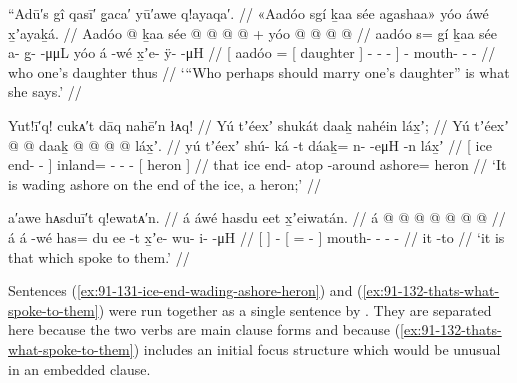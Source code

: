 \ex\label{ex:91-130-who-should-marry-she-says}%
%
\begingl
	\glpreamble	“Adū′s gî qasī′ g̣aca′ yū′awe q!ayaqa′. //
	\glpreamble	«\!Aadóo sgí ḵaa sée ag̱ashaa\!» yóo áwé x̱ʼayaḵá.  //
	\gla	{} Aadóo  @ {} {} ḵaa sée {}
			 @ {} @ {} @ {} @ {} {} +
		yóo  @ {}  @ {} @ {} @ {} //
	\glb	{} aadóo s= gí {} ḵaa sée {} a- {} g̱-  -μμL {}
		yóo á -wé x̱ʼe- ÿ-  -μH //
	\glc	{}[ aadóo =  {}[  daughter {}]
			- \· -  - {}]
		  - mouth- -  - //
	\gld	{} who  {} {} one’s daughter {}
			 {} {} {} {} {}
		thus  {}  {} {} {} //
	\glft	‘“Who perhaps should marry one’s daughter” is what she says.’
		//
\endgl
\xe

\ex\label{ex:91-131-ice-end-wading-ashore-heron}%
%
\begingl
	\glpreamble	Yut!ī′q! cukᴀ′t dāq nahē′n łᴀq! //
	\glpreamble	Yú tʼéexʼ shukát daaḵ nahéin láx̱ʼ; //
	\gla	{} Yú tʼéexʼ  @ {} @ {} {}
		daaḵ @  @ {} @ {} @ {}
		{} láx̱ʼ. {} //
	\glb	{} yú tʼéexʼ shú- ká -t {}
		dáaḵ= n-  -eμH -n
		{} láx̱ʼ {} //
	\glc	{}[  ice end-  - {}]
		inland= -  - -
		{}[ heron {}] //
	\gld	{} that ice end- atop -around {}
		ashore=  {} {} {}
		{} heron {} //
	\glft	‘It is wading ashore on the end of the ice, a heron;’
		//
\endgl
\xe

\ex\label{ex:91-132-thats-what-spoke-to-them}%
%
\begingl
	\glpreamble	a′awe hᴀsduī′t q!ewatᴀ′n. //
	\glpreamble	á áwé hasdu eet x̱ʼeiwatán. //
	\gla	{} á {}  @ {} {}  @ {}  @ {} {} 
		 @ {} @ {} @ {} @ {} //
	\glb	{} á {} á -wé {} has= du ee -t {}
		x̱ʼe- wu- i-  -μH //
	\glc	{}[  {}]  -
		{}[ =   - {}]
		mouth- - -  - //
	\gld	{} it {}  {} {}  {} {} -to {} 
		 {} {} {} {} //
	\glft	‘it is that which spoke to them.’
		//
\endgl
\xe

Sentences (\ref{ex:91-131-ice-end-wading-ashore-heron}) and (\ref{ex:91-132-thats-what-spoke-to-them}) were run together as a single sentence by \citeauthor{swanton:1909}.
They are separated here because the two verbs are main clause forms and because (\ref{ex:91-132-thats-what-spoke-to-them}) includes an initial focus structure which would be unusual in an embedded clause.

